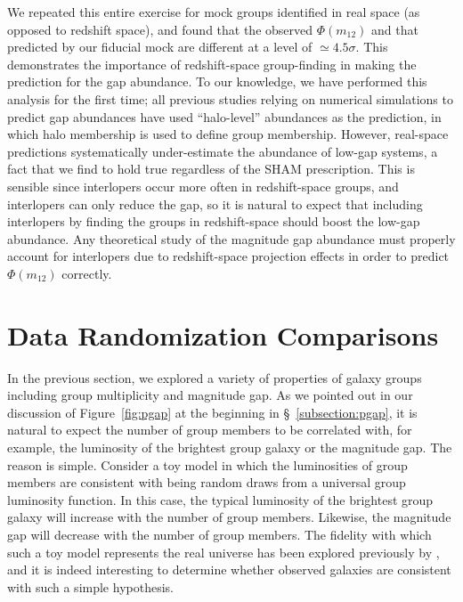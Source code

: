 \documentclass[usenatbib,usegraphicx,letterpaper]{mn2e}
\newcommand{\monetwo}{m_{12}}
\begin{document}
We repeated this entire exercise for mock groups identified in real space 
(as opposed to redshift space), and found that the observed $\Phi(\monetwo)$ and 
that predicted by our fiducial mock are different at a level of $\simeq 4.5\sigma$. 
This demonstrates the importance of redshift-space group-finding in making the 
prediction for the gap abundance. 
To our knowledge, we have performed this analysis for the first time; 
all previous studies relying on numerical simulations to predict gap abundances 
have used ``halo-level'' abundances as the prediction, 
in which halo membership is used to define group membership. 
However, real-space predictions systematically under-estimate 
the abundance of low-gap systems, a fact that we find to hold true 
regardless of the SHAM prescription. This is sensible since interlopers 
occur more often in redshift-space groups, and interlopers can only reduce 
the gap, so it is natural to expect that including interlopers by 
finding the groups in redshift-space should boost the low-gap abundance.  
Any theoretical study of the magnitude gap abundance must properly account 
for interlopers due to redshift-space projection effects in order to predict $\Phi(\monetwo)$ correctly. 
 

\section{Data Randomization Comparisons}
\label{section:mcs}

In the previous section, we explored a variety of properties of 
galaxy groups including group multiplicity and magnitude gap.  
As we pointed out in our discussion of Figure~\ref{fig:pgap} at the beginning in \S~\ref{subsection:pgap}, 
it is natural to expect the number of group members to be correlated with, for example, 
the luminosity of the brightest group galaxy or the magnitude gap. 
The reason is simple. Consider a toy model in which the luminosities of 
group members are consistent with being random draws from a universal group luminosity function. 
In this case, the typical luminosity of the brightest group galaxy will increase with 
the number of group members.  Likewise, the magnitude gap will decrease with 
the number of group members. The fidelity with which such a toy model represents 
the real universe has been explored previously by 
\citet{paranjape_sheth11}, and it is indeed interesting to determine whether 
observed galaxies are consistent with such a simple hypothesis.  
\end{document}
